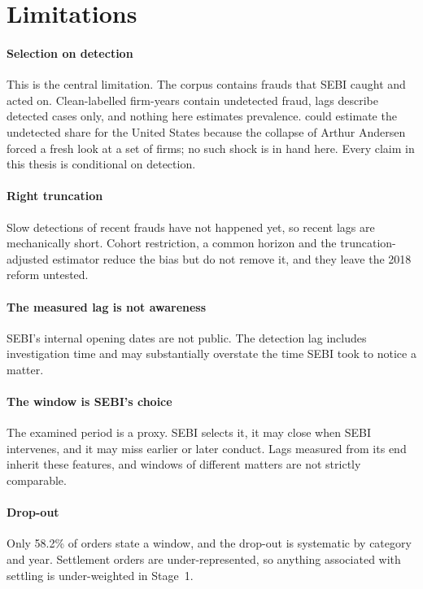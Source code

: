 \documentclass[letterpaper,11pt,leqno]{article}
\begin{document}
\section{Limitations}\label{s:limitations}

\paragraph{Selection on detection} This is the central limitation. The corpus contains frauds that SEBI caught and acted on. Clean-labelled firm-years contain undetected fraud, lags describe detected cases only, and nothing here estimates prevalence. \citet{DMZ24} could estimate the undetected share for the United States because the collapse of Arthur Andersen forced a fresh look at a set of firms; no such shock is in hand here. Every claim in this thesis is conditional on detection.

\paragraph{Right truncation} Slow detections of recent frauds have not happened yet, so recent lags are mechanically short. Cohort restriction, a common horizon and the truncation-adjusted estimator reduce the bias but do not remove it, and they leave the 2018 reform untested.

\paragraph{The measured lag is not awareness} SEBI's internal opening dates are not public. The detection lag includes investigation time and may substantially overstate the time SEBI took to notice a matter.

\paragraph{The window is SEBI's choice} The examined period is a proxy. SEBI selects it, it may close when SEBI intervenes, and it may miss earlier or later conduct. Lags measured from its end inherit these features, and windows of different matters are not strictly comparable.

\paragraph{Drop-out} Only 58.2\% of orders state a window, and the drop-out is systematic by category and year. Settlement orders are under-represented, so anything associated with settling is under-weighted in Stage~1.
\end{document}
